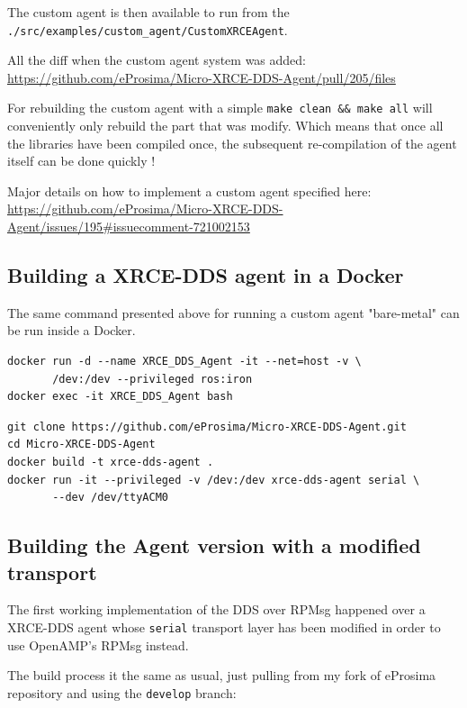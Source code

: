\documentclass[10pt]{article}
\begin{document}
The custom agent is then available to run from the \texttt{./src/examples/custom\_agent/CustomXRCEAgent}.

All the diff when the custom agent system was added:
\url{https://github.com/eProsima/Micro-XRCE-DDS-Agent/pull/205/files}

For rebuilding the custom agent with a simple \texttt{make clean \&\& make all} will
conveniently only rebuild the part that was modify.
Which means that once all the libraries have been compiled once,
the subsequent re-compilation of the agent itself can be done quickly !

Major details on how to implement a custom agent specified here:
\url{https://github.com/eProsima/Micro-XRCE-DDS-Agent/issues/195\#issuecomment-721002153}

\subsection{Building a XRCE-DDS agent in a Docker}
\label{sec:org27abf5f}
The same command presented above for running a custom agent "bare-metal" can be
run inside a Docker.

\begin{verbatim}
docker run -d --name XRCE_DDS_Agent -it --net=host -v \
       /dev:/dev --privileged ros:iron
docker exec -it XRCE_DDS_Agent bash
\end{verbatim}


\begin{verbatim}
git clone https://github.com/eProsima/Micro-XRCE-DDS-Agent.git
cd Micro-XRCE-DDS-Agent
docker build -t xrce-dds-agent .
docker run -it --privileged -v /dev:/dev xrce-dds-agent serial \
       --dev /dev/ttyACM0
\end{verbatim}

\subsection{Building the Agent version with a modified transport}
\label{sec:org6acd8f3}
The first working implementation of the DDS over RPMsg happened over a
XRCE-DDS agent whose \texttt{serial} transport layer has been modified in order
to use OpenAMP's RPMsg instead.

The build process it the same as usual, just pulling from my fork of eProsima repository
and using the \texttt{develop} branch:
\end{document}
